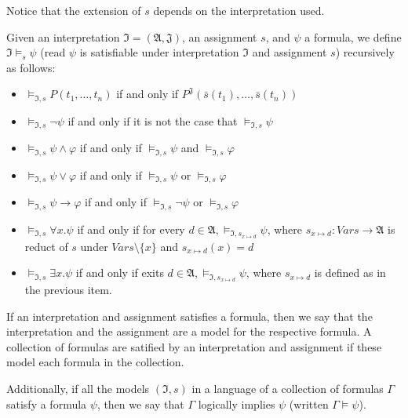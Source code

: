 Notice that the extension of $s$ depends on the interpretation used.

\begin{definition}
  Given an interpretation $\mathfrak{I} = (\mathfrak{A}, \mathfrak{J})$, an assignment $s$, and $\psi$ a formula, we define $\mathfrak{I} \models_s \psi$ (read $\psi$ is satisfiable under interpretation $\mathfrak{I}$ and assignment $s$) recursively as follows:
  \begin{itemize}
    \item $\models_{\mathfrak{I}, s} P(t_1, \dots, t_n)$ if and only if $P^{\mathfrak{J}}(\bar{s}(t_1), \dots, \bar{s}(t_n))$
    \item $\models_{\mathfrak{I}, s} \neg \psi$ if and only if  it is not the case that $\models_{\mathfrak{I}, s}   \psi$
    \item $\models_{\mathfrak{I}, s} \psi \land \varphi$ if and only if $\models_{\mathfrak{I}, s}  \psi$ and $   \models_{\mathfrak{I}, s}  \varphi$
    \item $   \models_{\mathfrak{I}, s}  \psi \lor \varphi$ if and only if $   \models_{\mathfrak{I}, s}  \psi$ or $   \models_{\mathfrak{I}, s}  \varphi$
    \item $   \models_{\mathfrak{I}, s}  \psi \rightarrow \varphi$ if and only if $   \models_{\mathfrak{I}, s}  \neg \psi$ or $   \models_{\mathfrak{I}, s}  \varphi$
    \item $   \models_{\mathfrak{I}, s}  \forall x . \psi$ if and only if for every $d \in \mathfrak{A},    \models_{\mathfrak{I}, s_{x \mapsto d}} \psi$, where $s_{x \mapsto d} : Vars \rightarrow \mathfrak{A}$ is reduct of $s$ under $Vars \setminus \{x\}$ and $s_{x \mapsto d}(x) = d$
    \item $   \models_{\mathfrak{I}, s}  \exists x . \psi$ if and only if exits $d \in \mathfrak{A},    \models_{\mathfrak{I}, s_{x \mapsto d}} \psi$, where $s_{x \mapsto d}$ is defined as in the previous item.
  \end{itemize}

If an interpretation and assignment satisfies a formula, then we say that the interpretation and the assignment are a model for the respective formula. A collection of formulas are satified by an interpretation and assignment if these model each formula in the collection.

Additionally, if all the models $(\mathfrak{I}, s)$ in a language of a collection of formulas $\Gamma$ satisfy a formula $\psi$, then we say that $\Gamma$ logically implies $\psi$ (written $\Gamma \models \psi$).
\end{definition}

